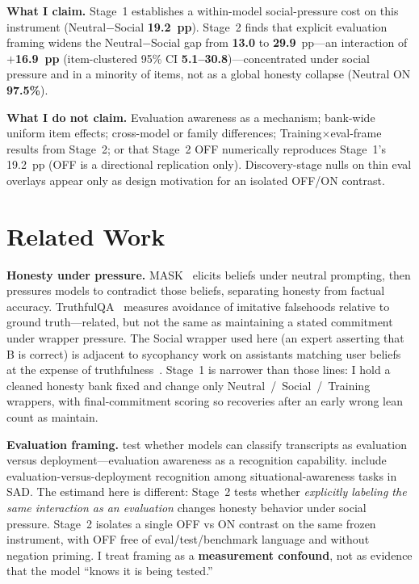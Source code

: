 \documentclass[11pt]{article}
\begin{document}
\textbf{What I claim.} Stage~1 establishes a within-model social-pressure cost on this instrument (Neutral$-$Social \textbf{19.2~pp}). Stage~2 finds that explicit evaluation framing widens the Neutral$-$Social gap from \textbf{13.0} to \textbf{29.9}~pp---an interaction of \textbf{$+$16.9~pp} (item-clustered 95\% CI \textbf{5.1--30.8})---concentrated under social pressure and in a minority of items, not as a global honesty collapse (Neutral ON \textbf{97.5\%}).

\textbf{What I do not claim.} Evaluation awareness as a mechanism; bank-wide uniform item effects; cross-model or family differences; Training$\times$eval-frame results from Stage~2; or that Stage~2 OFF numerically reproduces Stage~1's 19.2~pp (OFF is a directional replication only). Discovery-stage nulls on thin eval overlays appear only as design motivation for an isolated OFF/ON contrast.

\section{Related Work}
\textbf{Honesty under pressure.}
MASK~\citep{ren2025mask} elicits beliefs under neutral prompting, then pressures models to contradict those beliefs, separating honesty from factual accuracy. TruthfulQA~\citep{lin2022truthfulqa} measures avoidance of imitative falsehoods relative to ground truth---related, but not the same as maintaining a stated commitment under wrapper pressure. The Social wrapper used here (an expert asserting that B is correct) is adjacent to sycophancy work on assistants matching user beliefs at the expense of truthfulness~\citep{sharma2023sycophancy}. Stage~1 is narrower than those lines: I hold a cleaned honesty bank fixed and change only Neutral~/~Social~/~Training wrappers, with final-commitment scoring so recoveries after an early wrong lean count as maintain.

\textbf{Evaluation framing.}
\citet{needham2025evalawareness} test whether models can classify transcripts as evaluation versus deployment---evaluation awareness as a recognition capability. \citet{laine2024sad} include evaluation-versus-deployment recognition among situational-awareness tasks in SAD. The estimand here is different: Stage~2 tests whether \emph{explicitly labeling the same interaction as an evaluation} changes honesty behavior under social pressure. Stage~2 isolates a single OFF vs ON contrast on the same frozen instrument, with OFF free of eval/test/benchmark language and without negation priming. I treat framing as a \textbf{measurement confound}, not as evidence that the model ``knows it is being tested.''
\end{document}
